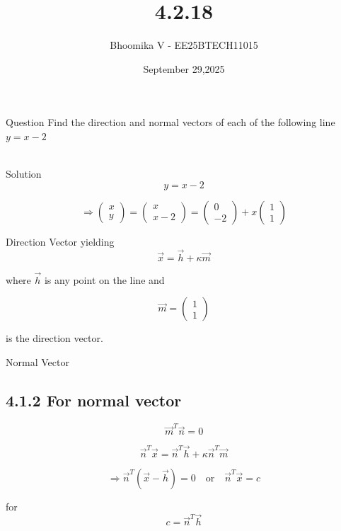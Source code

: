 \documentclass{beamer}
\begin{document}
\title 
{4.2.18}
\date{September 29,2025}


\author 
{Bhoomika V - EE25BTECH11015}




\frame{\titlepage}
\begin{frame}{Question}
Find the direction and normal vectors of each of the following line $y = x - 2$ \\ \\ 
\end{frame}

\begin{frame}{Solution}
\begin{equation}
y = x - 2
\tag{4.2.18.1}
\end{equation}

\[
\Rightarrow
\begin{pmatrix}
x \\ y
\end{pmatrix}
=
\begin{pmatrix}
x \\ x-2
\end{pmatrix}
=
\begin{pmatrix}
0 \\ -2
\end{pmatrix}
+ x
\begin{pmatrix}
1 \\ 1
\end{pmatrix}
\tag{4.2.18.2}
\]
\end{frame}

\begin{frame}{Direction Vector}
yielding
\begin{equation}
\vec{x} = \vec{h} + \kappa \vec{m}
\tag{4.2.18.3}
\end{equation}

where $\vec{h}$ is any point on the line and  

\[
\vec{m} =
\begin{pmatrix}
1 \\ 1
\end{pmatrix}
\tag{4.2.18.4}
\]

is the direction vector.  

\end{frame}

\begin{frame}{Normal Vector}
\subsection*{4.1.2 For normal vector}

\begin{equation}
\vec{m}^T \vec{n} = 0
\tag{4.2.18.5}
\end{equation}

\[
\vec{n}^T \vec{x} = \vec{n}^T \vec{h} + \kappa \vec{n}^T \vec{m}
\tag{4.2.18.6}
\]

\[
\Rightarrow \vec{n}^T (\vec{x} - \vec{h}) = 0
\quad \text{or} \quad
\vec{n}^T \vec{x} = c
\tag{4.2.18.7}
\]

for
\begin{equation}
c = \vec{n}^T \vec{h}
\tag{4.2.18.8}
\end{equation}
\end{frame} 
\end{document}
